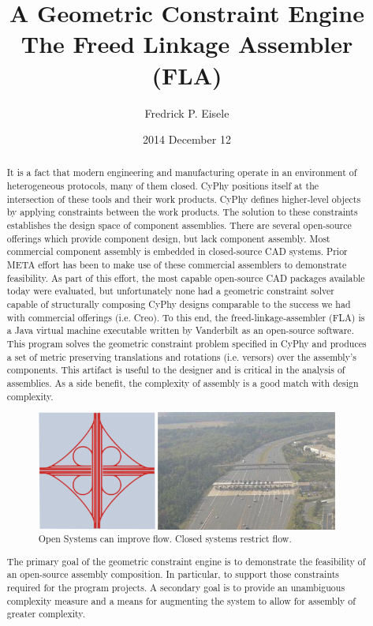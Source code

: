 \documentclass[]{report}
\title{A Geometric Constraint Engine \\
	The Freed Linkage Assembler (FLA)}
\author{Fredrick P. Eisele}
\date{2014 December 12}
\begin{document}
	\maketitle
	
	\begin{abstract}
		It is a fact that modern engineering and manufacturing operate in an environment of heterogeneous protocols, many of them closed. 
		CyPhy positions itself at the intersection of these tools and their work products. 
		CyPhy defines higher-level objects by applying constraints between the work products. 
		The solution to these constraints establishes the design space of component assemblies. 
		There are several open-source offerings which provide component design, but lack component assembly. 
		Most commercial component assembly is embedded in closed-source CAD systems. 
		Prior META effort has been to make use of these commercial assemblers to demonstrate feasibility.  
		As part of this effort, the most capable open-source CAD packages available today were evaluated, 
		but unfortunately none had a geometric constraint solver capable of structurally 
		composing CyPhy designs comparable to the success we had with commercial offerings (i.e. Creo).  
		To this end, the freed-linkage-assembler (FLA) is a Java virtual machine 
		executable written by Vanderbilt as an open-source software. 
		This program solves the geometric constraint problem specified in CyPhy and 
		produces a set of metric preserving translations and rotations (i.e. versors) over the assembly’s components. 
		This artifact is useful to the designer and is critical in the analysis of assemblies. 
		As a side benefit, the complexity of assembly is a good match with design complexity.

\begin{figure}[h!]
	\centering
	\includegraphics[scale=0.7]{images/image07}
	\caption{Open Systems can improve flow.  Closed systems restrict flow.}
	\label{fig:open-or-restrict-flow}
\end{figure}

The primary goal of the geometric constraint engine is to demonstrate the feasibility of an open-source assembly composition. In particular, to support those constraints required for the program projects. A secondary goal is to provide an unambiguous complexity measure and a means for augmenting the system to allow for assembly of greater complexity.
	\end{abstract}
\end{document}
